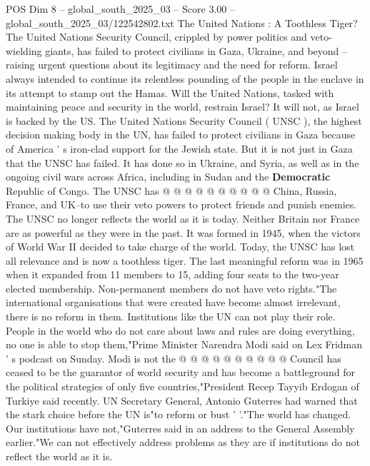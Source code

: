 \begin{textsample}{POS Dim 8 – global\_south\_2025\_03 – Score 3.00 – global\_south\_2025\_03/122542802.txt}  \label{ex:f8_pos_384}
The United Nations : A Toothless Tiger?
The United Nations Security Council, crippled by power politics and veto-wielding giants, has failed to protect civilians in Gaza, Ukraine, and beyond -- raising urgent questions about its legitimacy and the need for reform.
Israel always intended to continue its relentless pounding of the people in the enclave in its attempt to stamp out the Hamas.
Will the United Nations, tasked with maintaining peace and security in the world, restrain Israel?
It will not, as Israel is backed by the US.
The United Nations Security Council ( UNSC ), the highest decision making body in the UN, has failed to protect civilians in Gaza because of America ' s iron-clad support for the Jewish state.
But it is not just in Gaza that the UNSC has failed.
It has done so in Ukraine, and Syria, as well as in the ongoing civil wars across Africa, including in Sudan and the \textbf{Democratic} Republic of Congo.
The UNSC has @ @ @ @ @ @ @ @ @ @ China, Russia, France, and UK--to use their veto powers to protect friends and punish enemies.
The UNSC no longer reflects the world as it is today.
Neither Britain nor France are as powerful as they were in the past.
It was formed in 1945, when the victors of World War II decided to take charge of the world.
Today, the UNSC has lost all relevance and is now a toothless tiger.
The last meaningful reform was in 1965 when it expanded from 11 members to 15, adding four seats to the two-year elected membership.
Non-permanent members do not have veto rights."The international organisations that were created have become almost irrelevant, there is no reform in them.
Institutions like the UN can not play their role.
People in the world who do not care about laws and rules are doing everything, no one is able to stop them,"Prime Minister Narendra Modi said on Lex Fridman ' s podcast on Sunday.
Modi is not the @ @ @ @ @ @ @ @ @ @ Council has ceased to be the guarantor of world security and has become a battleground for the political strategies of only five countries,"President Recep Tayyib Erdogan of Turkiye said recently.
UN Secretary General, Antonio Guterres had warned that the stark choice before the UN is"to reform or bust ' '."The world has changed.
Our institutions have not,"Guterres said in an address to the General Assembly earlier."We can not effectively address problems as they are if institutions do not reflect the world as it is.

\end{textsample}
